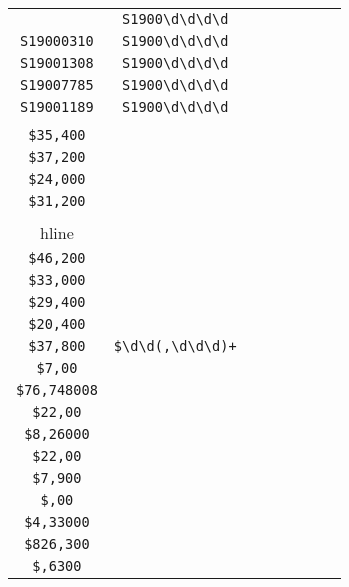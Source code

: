 \begin{longtable}{cccccccc}
\begin{tabular}{ll}
    \verb|S19007147| & \verb|S1900\d\d\d\d|\\
\verb|S19000310| & \verb|S1900\d\d\d\d|\\
\verb|S19001308| & \verb|S1900\d\d\d\d|\\
\verb|S19007785| & \verb|S1900\d\d\d\d|\\
\verb|S19001189| & \verb|S1900\d\d\d\d|
\end{tabular}
\\\midrule 
\begin{tabular}{l}
    \verb|$31,800|\\
\verb|$35,400|\\
\verb|$37,200|\\
\verb|$24,000|\\
\verb|$31,200|\\
\\hline\\
\verb|$46,200|\\
\verb|$33,000|\\
\verb|$29,400|\\
\verb|$20,400|\\
\verb|$37,800|
\end{tabular}

&
\verb|$\d\d(,\d\d\d)+|
&

\begin{tabular}{l}
    \verb|$(\d)*,(\d)*00(\d)*|\\
\verb|$7,00|\\
\verb|$76,748008|\\
\verb|$22,00|\\
\verb|$8,26000|\\
\verb|$22,00|
\end{tabular}

&

\begin{tabular}{l}
    \verb|$(\d)*,(\d)*00|\\
\verb|$7,900|\\
\verb|$,00|\\
\verb|$4,33000|\\
\verb|$826,300|\\
\verb|$,6300|
\end{tabular}

&


\end{longtable}
